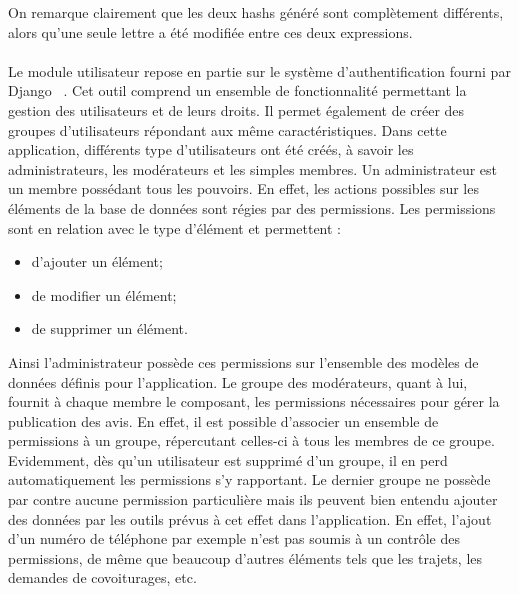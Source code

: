 \documentclass[12pt, a4paper, oneside]{article}
\begin{document}
        On remarque clairement que les deux hashs généré sont complètement différents, alors qu'une seule lettre a été modifiée entre ces deux expressions.\\\\
    \indent Le module utilisateur repose en partie sur le système d'authentification fourni par Django ~\cite{django-auth}. Cet outil comprend un ensemble de fonctionnalité permettant la gestion des utilisateurs et de leurs droits. Il permet également de créer des groupes d'utilisateurs répondant aux même caractéristiques. Dans cette application, différents type d'utilisateurs ont été créés, à savoir les administrateurs, les modérateurs et les simples membres. Un administrateur est un membre possédant tous les pouvoirs. En effet, les actions possibles sur les éléments de la base de données sont régies par des permissions. Les permissions sont en relation avec le type d'élément et permettent :\\
    \begin{itemize}
        \item d'ajouter un élément;
        \item de modifier un élément;
        \item de supprimer un élément.\\
    \end{itemize}
    Ainsi l'administrateur possède ces permissions sur l'ensemble des modèles de données définis pour l'application. Le groupe des modérateurs, quant à lui, fournit à chaque membre le composant, les permissions nécessaires pour gérer la publication des avis. En effet, il est possible d'associer un ensemble de permissions à un groupe, répercutant celles-ci à tous les membres de ce groupe. Evidemment, dès qu'un utilisateur est supprimé d'un groupe, il en perd automatiquement les permissions s'y rapportant. Le dernier groupe ne possède par contre aucune permission particulière mais ils peuvent bien entendu ajouter des données par les outils prévus à cet effet dans l'application. En effet, l'ajout d'un numéro de téléphone par exemple n'est pas soumis à un contrôle des permissions, de même que beaucoup d'autres éléments tels que les trajets, les demandes de covoiturages, etc.

\end{document}
